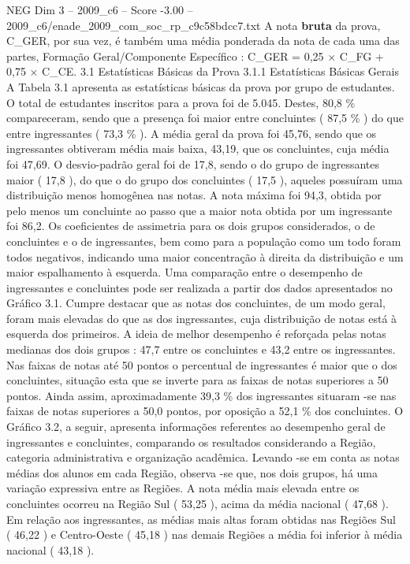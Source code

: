 \begin{textsample}{NEG Dim 3 – 2009\_c6 – Score -3.00 – 2009\_c6/enade\_2009\_com\_soc\_rp\_c9c58bdcc7.txt}
A nota \textbf{bruta} da prova, C\_GER, por sua vez, é também uma média ponderada da nota de cada uma das partes, Formação Geral/Componente Específico : C\_GER = 0,25 × C\_FG + 0,75 × C\_CE. 3.1 Estatísticas Básicas da Prova 3.1.1 Estatísticas Básicas Gerais A Tabela 3.1 apresenta as estatísticas básicas da prova por grupo de estudantes.
O total de estudantes inscritos para a prova foi de 5.045.
Destes, 80,8 \% compareceram, sendo que a presença foi maior entre concluintes ( 87,5 \% ) do que entre ingressantes ( 73,3 \% ).
A média geral da prova foi 45,76, sendo que os ingressantes obtiveram média mais baixa, 43,19, que os concluintes, cuja média foi 47,69.
O desvio-padrão geral foi de 17,8, sendo o do grupo de ingressantes maior ( 17,8 ), do que o do grupo dos concluintes ( 17,5 ), aqueles possuíram uma distribuição menos homogênea nas notas.
A nota máxima foi 94,3, obtida por pelo menos um concluinte ao passo que a maior nota obtida por um ingressante foi 86,2.
Os coeficientes de assimetria para os dois grupos considerados, o de concluintes e o de ingressantes, bem como para a população como um todo foram todos negativos, indicando uma maior concentração à direita da distribuição e um maior espalhamento à esquerda.
Uma comparação entre o desempenho de ingressantes e concluintes pode ser realizada a partir dos dados apresentados no Gráfico 3.1.
Cumpre destacar que as notas dos concluintes, de um modo geral, foram mais elevadas do que as dos ingressantes, cuja distribuição de notas está à esquerda dos primeiros.
A ideia de melhor desempenho é reforçada pelas notas medianas dos dois grupos : 47,7 entre os concluintes e 43,2 entre os ingressantes.
Nas faixas de notas até 50 pontos o percentual de ingressantes é maior que o dos concluintes, situação esta que se inverte para as faixas de notas superiores a 50 pontos.
Ainda assim, aproximadamente 39,3 \% dos ingressantes situaram -se nas faixas de notas superiores a 50,0 pontos, por oposição a 52,1 \% dos concluintes.
O Gráfico 3.2, a seguir, apresenta informações referentes ao desempenho geral de ingressantes e concluintes, comparando os resultados considerando a Região, categoria administrativa e organização acadêmica.
Levando -se em conta as notas médias dos alunos em cada Região, observa -se que, nos dois grupos, há uma variação expressiva entre as Regiões.
A nota média mais elevada entre os concluintes ocorreu na Região Sul ( 53,25 ), acima da média nacional ( 47,68 ).
Em relação aos ingressantes, as médias mais altas foram obtidas nas Regiões Sul ( 46,22 ) e Centro-Oeste ( 45,18 ) nas demais Regiões a média foi inferior à média nacional ( 43,18 ).

\end{textsample}
